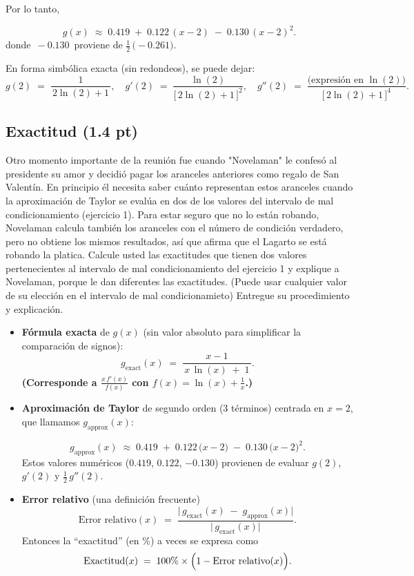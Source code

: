 Por lo tanto,

\[
\boxed{
g(x)\;\approx\;0.419 
\;+\;0.122\,(x-2)
\;-\;0.130\,(x-2)^{2}.
}
\]
donde \(\,-0.130\,\) proviene de \(\tfrac12\,\bigl(-0.261\bigr)\).  

En forma simbólica exacta (sin redondeos), se puede dejar:
\[
g(2) \;=\;\frac{1}{\,2\ln(2)+1\,},\quad
g'(2)\;=\;\frac{\ln(2)}{\bigl[\,2\ln(2)+1\,\bigr]^2},\quad
g''(2)\;=\;\frac{\text{(expresión en }\ln(2)\text{)}}{\bigl[\,2\ln(2)+1\,\bigr]^4}.
\]

\subsection{Exactitud (1.4 pt)}

Otro momento importante  de la reunión  fue cuando "Novelaman" le confesó al presidente  su amor y decidió  pagar los aranceles anteriores como regalo de San Valentín. En principio él necesita saber cuánto representan estos aranceles cuando la aproximación de Taylor se evalúa en dos de los valores del intervalo de mal condicionamiento (ejercicio 1). Para estar seguro que no lo están robando, Novelaman calcula también los aranceles con el número de condición verdadero, pero no obtiene los mismos resultados, así que afirma que el Lagarto se está robando la platica.  Calcule usted las exactitudes que tienen dos valores pertenecientes al intervalo de mal condicionamiento del ejercicio 1 y explique a Novelaman, porque le dan diferentes las exactitudes.  (Puede usar cualquier valor de su elección en el intervalo de mal condicionamieto) Entregue su procedimiento y explicación.


\begin{itemize}
    \item \textbf{Fórmula exacta} de \(g(x)\) (sin valor absoluto para simplificar la comparación de signos):  
    \[
        g_{\text{exact}}(x) \;=\; \frac{x-1}{\,x\,\ln(x)\;+\;1\,}.
        \]
        \textbf{(Corresponde a \(\frac{x\,f'(x)}{f(x)}\) con \(f(x)=\ln(x)+\frac{1}{x}\).)}
        
    \item \textbf{Aproximación de Taylor} de segundo orden (3 términos) centrada en \(x=2\), que llamamos \(g_{\text{approx}}(x)\):
    
       \[
       g_{\text{approx}}(x) 
       \;\approx\; 0.419 
         \;+\;0.122\,\bigl(x-2\bigr)
         \;-\;0.130\,\bigl(x-2\bigr)^{2}.
       \]
       Estos valores numéricos (\(0.419\), \(0.122\), \(-0.130\)) provienen de evaluar \(g(2)\), \(g'(2)\) y \(\tfrac12\,g''(2)\).
    \item \textbf{Error relativo} (una definición frecuente)  
    \[
    \text{Error relativo}(x)
    \;=\;\frac{\bigl|\,g_{\text{exact}}(x)\;-\;g_{\text{approx}}(x)\bigr|}{\bigl|\,g_{\text{exact}}(x)\bigr|}.
    \]
    Entonces la “exactitud” (en \%) a veces se expresa como  
    \[
    \text{Exactitud}(x)
    \;=\;100\%\times \Bigl(1 - \text{Error relativo}(x)\Bigr).
    \]
    \end{itemize}


